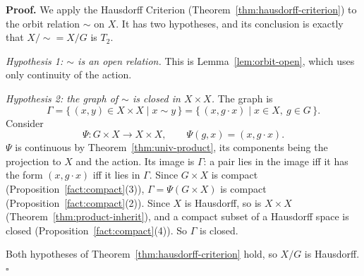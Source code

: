\documentclass[11pt]{report}
\renewenvironment{proof}[1][Proof]{\noindent\textbf{#1.} }{\hfill$\square$\par\vspace{5pt}}
\begin{document}
\begin{proof}
We apply the Hausdorff Criterion (Theorem~\ref{thm:hausdorff-criterion}) to the orbit relation $\sim$ on $X$. It has two hypotheses, and its conclusion is exactly that $X/{\sim} = X/G$ is $T_2$.

\emph{Hypothesis 1: $\sim$ is an open relation.} This is Lemma~\ref{lem:orbit-open}, which uses only continuity of the action.

\emph{Hypothesis 2: the graph of $\sim$ is closed in $X \times X$.} The graph is
\[
\Gamma = \{\, (x, y) \in X \times X \mid x \sim y \,\} = \{\, (x, g \cdot x) \mid x \in X,\ g \in G \,\}.
\]
Consider
\[
\Psi : G \times X \longrightarrow X \times X, \qquad \Psi(g, x) = (x, g \cdot x). \tag{$\ast$}
\]
$\Psi$ is continuous by Theorem~\ref{thm:univ-product}, its components being the projection to $X$ and the action. Its image is $\Gamma$: a pair lies in the image iff it has the form $(x, g \cdot x)$ iff it lies in $\Gamma$. Since $G \times X$ is compact (Proposition~\ref{fact:compact}(3)), $\Gamma = \Psi(G \times X)$ is compact (Proposition~\ref{fact:compact}(2)). Since $X$ is Hausdorff, so is $X \times X$ (Theorem~\ref{thm:product-inherit}), and a compact subset of a Hausdorff space is closed (Proposition~\ref{fact:compact}(4)). So $\Gamma$ is closed.

Both hypotheses of Theorem~\ref{thm:hausdorff-criterion} hold, so $X/G$ is Hausdorff.
\end{proof}
\end{document}
